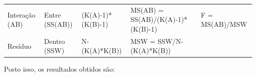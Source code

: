 \documentclass[
]{book}
\newenvironment{Shaded}{\begin{snugshade}}{\end{snugshade}}
\newcommand{\DataTypeTok}[1]{\textcolor[rgb]{0.13,0.29,0.53}{#1}}
\newcommand{\KeywordTok}[1]{\textcolor[rgb]{0.13,0.29,0.53}{\textbf{#1}}}
\newcommand{\NormalTok}[1]{#1}
\newcommand{\OperatorTok}[1]{\textcolor[rgb]{0.81,0.36,0.00}{\textbf{#1}}}
\newcommand{\OtherTok}[1]{\textcolor[rgb]{0.56,0.35,0.01}{#1}}
\newcommand{\StringTok}[1]{\textcolor[rgb]{0.31,0.60,0.02}{#1}}
\begin{document}
\begin{longtable}[]{@{}lllll@{}}
\begin{minipage}[t]{0.17\columnwidth}\raggedright
Interação (AB)\strut
\end{minipage} & \begin{minipage}[t]{0.17\columnwidth}\raggedright
Entre (SS(AB))\strut
\end{minipage} & \begin{minipage}[t]{0.17\columnwidth}\raggedright
(K(A)-1)*(K(B)-1)\strut
\end{minipage} & \begin{minipage}[t]{0.17\columnwidth}\raggedright
MS(AB) = SS(AB)/(K(A)-1)*(K(B)-1)\strut
\end{minipage} & \begin{minipage}[t]{0.17\columnwidth}\raggedright
F = MS(AB)/MSW\strut
\end{minipage}\tabularnewline
\begin{minipage}[t]{0.17\columnwidth}\raggedright
Resíduo\strut
\end{minipage} & \begin{minipage}[t]{0.17\columnwidth}\raggedright
Dentro (SSW)\strut
\end{minipage} & \begin{minipage}[t]{0.17\columnwidth}\raggedright
N-(K(A)*K(B))\strut
\end{minipage} & \begin{minipage}[t]{0.17\columnwidth}\raggedright
MSW = SSW/N-(K(A)*K(B))\strut
\end{minipage} & \begin{minipage}[t]{0.17\columnwidth}\raggedright
\strut
\end{minipage}\tabularnewline
\bottomrule
\end{longtable}

Posto isso, os resultados obtidos são:

\begin{Shaded}
\end{Shaded}
\end{document}
